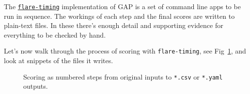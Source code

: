 \documentclass[gap.tex]{subfiles}
\begin{document}
The \href{https://github.com/BlockScope/flare-timing}{\texttt{flare-timing}}
implementation of GAP is a set of command line apps to be run in sequence.  The
workings of each step and the final scores are written to plain-text files.  In
these there's enough detail and supporting evidence for everything to be
checked by hand.

Let's now walk through the process of scoring with \texttt{flare-timing}, see
Fig~\ref{fig:flare-timing}, and look at snippets of the files it writes.

\begin{figure}[!ht]
    \centering
    
    \caption{Scoring as numbered steps from {\color{blue}original inputs} to
    {\color{csv}\texttt{*.csv}} or \texttt{*.yaml} outputs.}
    \label{fig:flare-timing}
\end{figure}
\end{document}
